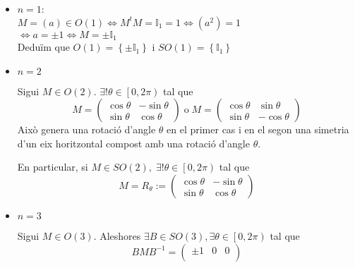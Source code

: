 \documentclass[../main.tex]{subfiles}
\begin{document}
\begin{itemize}
    \item $n = 1$:\\
    $M = (a) \in O(1) \iff M^tM = \mathbb{I}_1 = 1 \iff (a^2) = 1$\\$\iff a = \pm 1 \iff M = \pm \mathbb{I}_1$\\
    Deduïm que $O(1) = \left\{\pm \mathbb{I}_1\right\}$ i $SO(1) = \left\{\mathbb{I}_1\right\}$
    \item $n = 2$
    \begin{proposicio}
        Sigui $M \in O(2)$. $\exists! \theta \in \left[0, 2\pi\right)$ tal que\\
        \begin{displaymath}
            M = \begin{pmatrix}
                \cos{\theta} & -\sin{\theta}\\
                \sin{\theta} & \cos{\theta}
            \end{pmatrix}\;\text{o}\; M = \begin{pmatrix}
                \cos{\theta} & \sin{\theta}\\
                \sin{\theta} & -\cos{\theta}
            \end{pmatrix}
        \end{displaymath}
        Això genera una rotació d'angle $\theta$ en el primer cas i en el segon una simetria d'un
        eix horitzontal compost amb una rotació d'angle $\theta$.
    \end{proposicio}
    \begin{obs}
        En particular, si $M \in SO(2),\; \exists! \theta \in \left[0, 2\pi\right)$ tal que
        \begin{displaymath}
            M = R_\theta := \begin{pmatrix}
                \cos{\theta} & -\sin{\theta}\\
                \sin{\theta} & \cos{\theta}
            \end{pmatrix}
        \end{displaymath}
    \end{obs}
    \item $n = 3$
    \begin{proposicio}
        Sigui $M \in O(3)$. Aleshores $\exists B \in SO(3), \exists \theta \in \left[0, 2\pi\right)$
        tal que \begin{displaymath}
            BMB^{-1} = \begin{pmatrix}
                \pm 1 & 0 & 0\\

\end{pmatrix}
\end{displaymath}
\end{proposicio}
\end{itemize}
\end{document}
